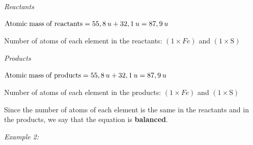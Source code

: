     \addtocounter{footnote}{-0}
    
        \par 
        \label{m38726*id63282}
          \textsl{Reactants}
        \par 
        \label{m38726*id63288}\begin{math}\mathrm{Atomic\; mass\; of\; reactants}=55,8\phantom{\rule{2pt}{0ex}}u+32,1\phantom{\rule{2pt}{0ex}}u=\mathrm{87,9}\phantom{\rule{2pt}{0ex}}u\end{math}\par 
        \label{m38726*id63292}Number of atoms of each element in the reactants: \begin{math}\left(1\ensuremath{\times}Fe\right)\end{math} and \begin{math}\left(1\ensuremath{\times}\mathrm{S}\right)\end{math}\par 
        \label{m38726*id63311}
          \textsl{Products}
        \par 
        \label{m38726*id63320}\begin{math}\mathrm{Atomic\; mass\; of\; products}=55,8\phantom{\rule{2pt}{0ex}}u+32,1\phantom{\rule{2pt}{0ex}}u=\mathrm{87,9}\phantom{\rule{2pt}{0ex}}u\end{math}\par 
        \label{m38726*id63323}Number of atoms of each element in the products: \begin{math}\left(1\ensuremath{\times}Fe\right)\end{math} and \begin{math}\left(1\ensuremath{\times}\mathrm{S}\right)\end{math}\par 
        \label{m38726*id63343}Since the number of atoms of each element is the same in the reactants and in the products, we say that the equation is \textbf{balanced}.\par 
        \label{m38726*id63352}
          \textsl{Example 2:}
        
